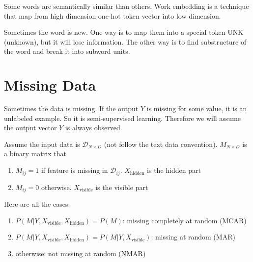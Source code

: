 \begin{definition}
    Some words are semantically similar than others. Work embedding is a technique that map from high dimension one-hot token vector into low dimension.
\end{definition}

\begin{example}
    Sometimes the word is new. One way is to map them into a special token UNK (unknown), but it will lose information. The other way is to find substructure of the word and break it into subword units.
\end{example}



\section{Missing Data}

Sometimes the data is missing. If the output $Y$ is missing for some value, it is an unlabeled example. So it is semi-supervised learning. Therefore we will assume the output vector $Y$ is always observed.

Assume the input data is $\mathcal{D}_{N \times D}$ (not follow the text data convention). $M_{N \times D}$ is a binary matrix that
\begin{enumerate}
    \item $M_{ij} = 1$ if feature is missing in $\mathcal{D}_{ij}$. $X_{\text{hidden}}$ is the hidden part
    \item $M_{ij} = 0$ otherwise. $X_{\text{visible}}$ is the visible part
\end{enumerate}

Here are all the cases:
\begin{enumerate}
    \item $P(M|Y,X_{\text{visible}}, X_{\text{hidden}}) = P(M)$: missing completely at random (MCAR)
    \item $P(M|Y,X_{\text{visible}}, X_{\text{hidden}}) = P(M|Y,X_{\text{visible}})$: missing at random (MAR)
    \item otherwise: not missing at random (NMAR)
\end{enumerate}

